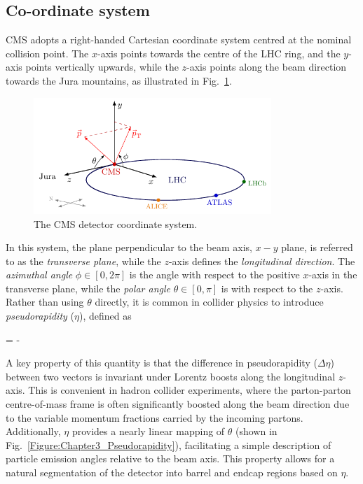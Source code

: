 \clearpage
\subsection{Co-ordinate system}
CMS adopts a right-handed Cartesian coordinate system centred at the nominal collision point. The $x$-axis points towards the centre of the LHC ring, and the $y$-axis points vertically upwards, while the $z$-axis points along the beam direction towards the Jura mountains, as illustrated in Fig.~\ref{Figure:Chapter3_CMS_CoordinateSystem}.

\begin{figure}[h]
\centering
\includegraphics[width= 0.8\textwidth]{Figures/Chapter3/CMS_CoordinateSystem.pdf}
\caption{The CMS detector coordinate system.}
\label{Figure:Chapter3_CMS_CoordinateSystem}
\end{figure}

In this system, the plane perpendicular to the beam axis, $x-y$ plane, is referred to as the \textit{transverse plane}, while the $z$-axis defines the \textit{longitudinal direction}. The \textit{azimuthal angle} $\phi \in [0,2\pi]$ is the angle with respect to the positive $x$-axis in the transverse plane, while the \textit{polar angle} $\theta \in [0,\pi]$ is with respect to the $z$-axis. Rather than using $\theta$ directly, it is common in collider physics to introduce \textit{pseudorapidity} ($\eta$), defined as

\begin{equation_pad}
    \eta = - \ln{}
\end{equation_pad}

A key property of this quantity is that the difference in pseudorapidity ($\Delta\eta$) between two vectors is invariant under Lorentz boosts along the longitudinal $z$-axis. This is convenient in hadron collider experiments, where the parton-parton centre-of-mass frame is often significantly boosted along the beam direction due to the variable momentum fractions carried by the incoming partons. Additionally, $\eta$ provides a nearly linear mapping of $\theta$ (shown in Fig.~\ref{Figure:Chapter3_Pseudorapidity}), facilitating a simple description of particle emission angles relative to the beam axis. This property allows for a natural segmentation of the detector into barrel and endcap regions based on $\eta$.

